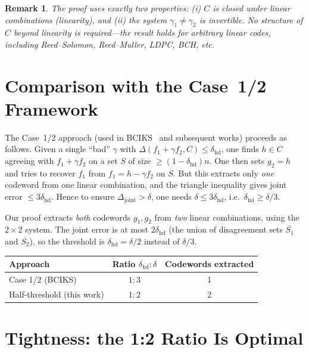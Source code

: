 \documentclass[11pt]{article}
\newtheorem{remark}[theorem]{Remark}
\newcommand{\dist}{\Delta}
\begin{document}
\begin{remark}
The proof uses exactly two properties: (i) $C$ is closed under linear
combinations (linearity), and (ii) the system
$\gamma_1 \ne \gamma_2$ is invertible.  No structure of $C$ beyond
linearity is required---the result holds for arbitrary linear codes,
including Reed--Solomon, Reed--Muller, LDPC, BCH, etc.
\end{remark}

\section{Comparison with the Case~1/2 Framework}

The Case~1/2 approach (used in BCIKS~\cite{BCIKS20} and subsequent
works) proceeds as follows.  Given a single ``bad'' $\gamma$ with
$\dist(f_1 + \gamma f_2, C) \le \delta_{\mathrm{hd}}$, one finds
$h \in C$ agreeing with $f_1 + \gamma f_2$ on a set $S$ of size
$\ge (1 - \delta_{\mathrm{hd}})n$.  One then sets $g_2 = h$ and tries
to recover $f_1$ from $f_1 = h - \gamma f_2$ on $S$.  But this
extracts only \emph{one} codeword from one linear combination, and the
triangle inequality gives joint error $\le 3\delta_{\mathrm{hd}}$.
Hence to ensure $\dist_{\mathrm{joint}} > \delta$, one needs
$\delta \le 3\delta_{\mathrm{hd}}$, i.e.\ $\delta_{\mathrm{hd}} \ge
\delta/3$.

\smallskip
Our proof extracts \emph{both} codewords $g_1, g_2$ from \emph{two}
linear combinations, using the $2 \times 2$ system.  The joint error is
at most $2\delta_{\mathrm{hd}}$ (the union of disagreement sets
$\overline{S_1}$ and $\overline{S_2}$), so the threshold is
$\delta_{\mathrm{hd}} = \delta/2$ instead of $\delta/3$.

\begin{center}
\begin{tabular}{lcc}
\hline
\textbf{Approach} & \textbf{Ratio $\delta_{\mathrm{hd}} : \delta$}
  & \textbf{Codewords extracted} \\
\hline
Case 1/2 (BCIKS) & $1:3$ & 1 \\
Half-threshold (this work) & $1:2$ & 2 \\
\hline
\end{tabular}
\end{center}

\section{Tightness: the 1:2 Ratio Is Optimal}
\end{document}
